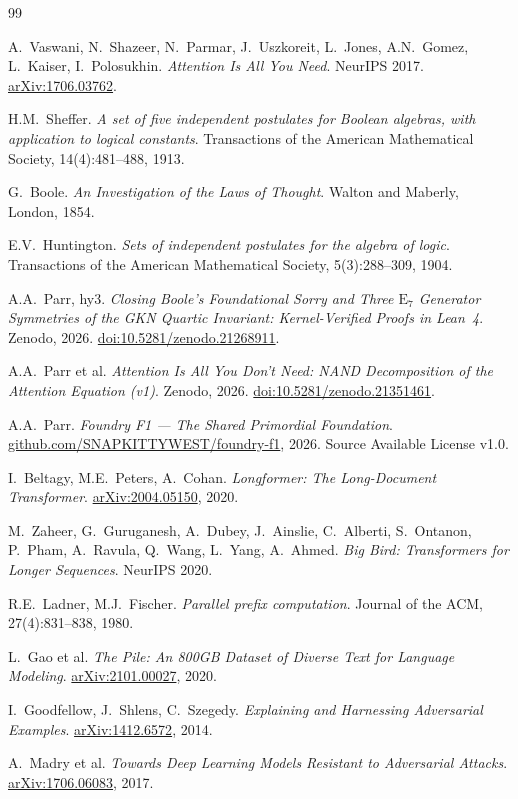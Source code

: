 \documentclass[11pt]{article}
\theoremstyle{definition}
\begin{document}
\begin{thebibliography}{99}

A.\ Vaswani, N.\ Shazeer, N.\ Parmar, J.\ Uszkoreit, L.\ Jones, A.N.\ Gomez,
L.\ Kaiser, I.\ Polosukhin.
\textit{Attention Is All You Need}.
NeurIPS 2017. \href{https://arxiv.org/abs/1706.03762}{arXiv:1706.03762}.

H.M.\ Sheffer.
\textit{A set of five independent postulates for Boolean algebras, with
application to logical constants}.
Transactions of the American Mathematical Society, 14(4):481--488, 1913.

G.\ Boole.
\textit{An Investigation of the Laws of Thought}.
Walton and Maberly, London, 1854.

E.V.\ Huntington.
\textit{Sets of independent postulates for the algebra of logic}.
Transactions of the American Mathematical Society, 5(3):288--309, 1904.

A.A.\ Parr, hy3.
\textit{Closing Boole's Foundational Sorry and Three $\mathrm{E}_7$ Generator
Symmetries of the GKN Quartic Invariant: Kernel-Verified Proofs in Lean~4}.
Zenodo, 2026. \href{https://doi.org/10.5281/zenodo.21268911}{doi:10.5281/zenodo.21268911}.

A.A.\ Parr et al.
\textit{Attention Is All You Don't Need: NAND Decomposition of the Attention Equation (v1)}.
Zenodo, 2026. \href{https://doi.org/10.5281/zenodo.21351461}{doi:10.5281/zenodo.21351461}.

A.A.\ Parr.
\textit{Foundry F1 — The Shared Primordial Foundation}.
\href{https://github.com/SNAPKITTYWEST/foundry-f1}{github.com/SNAPKITTYWEST/foundry-f1}, 2026.
Source Available License v1.0.

I.\ Beltagy, M.E.\ Peters, A.\ Cohan.
\textit{Longformer: The Long-Document Transformer}.
\href{https://arxiv.org/abs/2004.05150}{arXiv:2004.05150}, 2020.

M.\ Zaheer, G.\ Guruganesh, A.\ Dubey, J.\ Ainslie, C.\ Alberti, S.\ Ontanon,
P.\ Pham, A.\ Ravula, Q.\ Wang, L.\ Yang, A.\ Ahmed.
\textit{Big Bird: Transformers for Longer Sequences}.
NeurIPS 2020.

R.E.\ Ladner, M.J.\ Fischer.
\textit{Parallel prefix computation}.
Journal of the ACM, 27(4):831--838, 1980.

L.\ Gao et al.
\textit{The Pile: An 800GB Dataset of Diverse Text for Language Modeling}.
\href{https://arxiv.org/abs/2101.00027}{arXiv:2101.00027}, 2020.

I.\ Goodfellow, J.\ Shlens, C.\ Szegedy.
\textit{Explaining and Harnessing Adversarial Examples}.
\href{https://arxiv.org/abs/1412.6572}{arXiv:1412.6572}, 2014.

A.\ Madry et al.
\textit{Towards Deep Learning Models Resistant to Adversarial Attacks}.
\href{https://arxiv.org/abs/1706.06083}{arXiv:1706.06083}, 2017.

\end{thebibliography}
\end{document}
